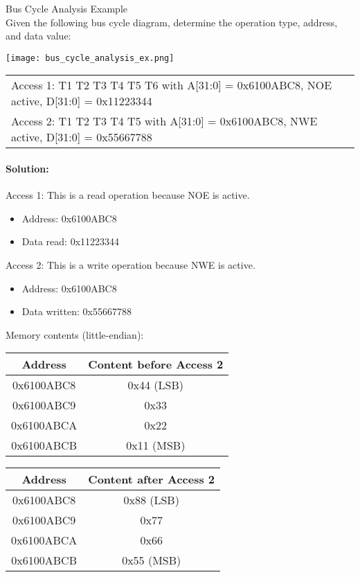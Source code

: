\begin{example2}{Bus Cycle Analysis Example}\\
Given the following bus cycle diagram, determine the operation type, address, and data value:

\texttt{[image: bus\_cycle\_analysis\_ex.png]}

\begin{center}
\begin{tabular}{l}
Access 1: T1 T2 T3 T4 T5 T6 with A[31:0] = 0x6100ABC8, NOE active, D[31:0] = 0x11223344 \\
Access 2: T1 T2 T3 T4 T5 with A[31:0] = 0x6100ABC8, NWE active, D[31:0] = 0x55667788
\end{tabular}
\end{center}

\tcblower
\paragraph{Solution:}
Access 1: This is a read operation because NOE is active.
\begin{itemize}
    \item Address: 0x6100ABC8
    \item Data read: 0x11223344
\end{itemize}

Access 2: This is a write operation because NWE is active.
\begin{itemize}
    \item Address: 0x6100ABC8
    \item Data written: 0x55667788
\end{itemize}

Memory contents (little-endian):
\begin{center}
\begin{tabular}{|c|c|}
\hline
\textbf{Address} & \textbf{Content before Access 2} \\
\hline
0x6100ABC8 & 0x44 (LSB) \\
0x6100ABC9 & 0x33 \\
0x6100ABCA & 0x22 \\
0x6100ABCB & 0x11 (MSB) \\
\hline
\end{tabular}
\quad
\begin{tabular}{|c|c|}
\hline
\textbf{Address} & \textbf{Content after Access 2} \\
\hline
0x6100ABC8 & 0x88 (LSB) \\
0x6100ABC9 & 0x77 \\
0x6100ABCA & 0x66 \\
0x6100ABCB & 0x55 (MSB) \\
\hline
\end{tabular}
\end{center}
\end{example2}



